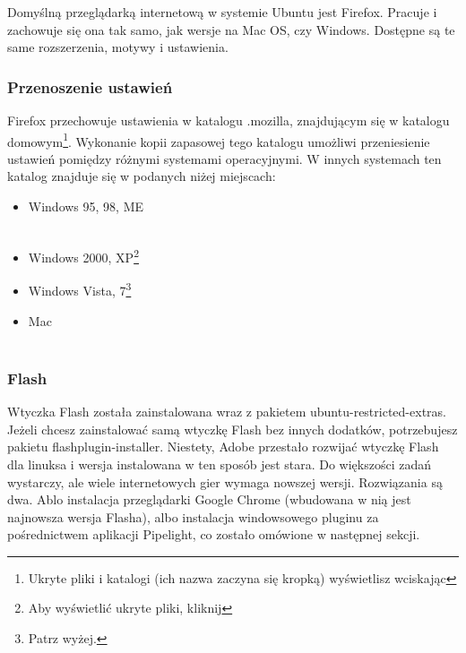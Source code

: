 Domyślną przeglądarką internetową w systemie Ubuntu jest Firefox. Pracuje i zachowuje się ona tak samo, jak wersje na Mac OS, czy Windows. Dostępne są te same rozszerzenia, motywy i ustawienia.

\subsubsection{Przenoszenie ustawień}
Firefox przechowuje ustawienia w katalogu .mozilla, znajdującym się w katalogu domowym\footnote{Ukryte pliki i katalogi (ich nazwa zaczyna się kropką) wyświetlisz wciskając }. Wykonanie kopii zapasowej tego katalogu umożliwi przeniesienie ustawień pomiędzy różnymi systemami operacyjnymi. W innych systemach ten katalog znajduje się w podanych niżej miejscach:
\begin{itemize}
\item Windows 95, 98, ME\\
\\
\item Windows 2000, XP\footnote{Aby wyświetlić ukryte pliki, kliknij }\\
\item Windows Vista, 7\footnote{Patrz wyżej.}\\
\item Mac\\
\\
\end{itemize}

\subsubsection{Flash}
Wtyczka Flash została zainstalowana wraz z pakietem \textcolor{ubuntu_orange}{ubuntu-restricted-extras}. Jeżeli chcesz zainstalować samą wtyczkę Flash bez innych dodatków, potrzebujesz pakietu \textcolor{ubuntu_orange}{flashplugin-installer}. Niestety, Adobe przestało rozwijać wtyczkę Flash dla linuksa i wersja instalowana w ten sposób jest stara. Do większości zadań wystarczy, ale wiele internetowych gier wymaga nowszej wersji. Rozwiązania są dwa. Ablo instalacja przeglądarki Google Chrome (wbudowana w nią jest najnowsza wersja Flasha), albo instalacja windowsowego pluginu za pośrednictwem aplikacji Pipelight, co zostało omówione w następnej sekcji.

